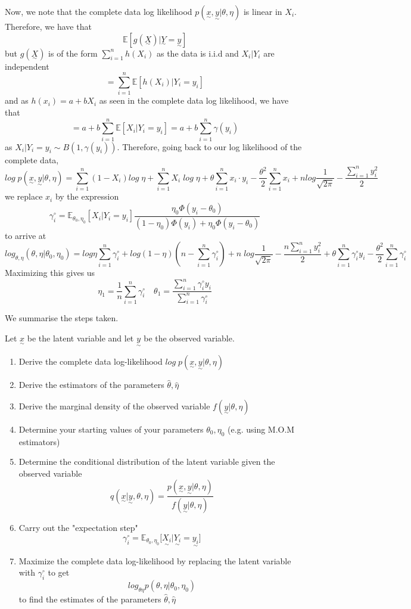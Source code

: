 \documentclass[twoside]{article}
\newcommand{\utilde}{\underset{\sim}}
\begin{document}
Now, we note that the complete data log likelihood $p(\utilde{x}, \utilde{y}| \theta, \eta)$ is linear in $X_i.$ Therefore, we have that
$$
\mathbb{E}[g(\utilde{X})|\utilde{Y} = \utilde{y}]
$$
but $g(\utilde{X})$ is of the form $\sum_{i=1}^{n}h(X_i)$ as the data is i.i.d and $X_i|Y_i$ are independent 
$$
= \sum_{i=1}^{n}\mathbb{E}[h(X_i)| Y_i = y_i]
$$
and as $h(x_i) = a + bX_i$ as seen in the complete data log likelihood, we have that 
$$
= a + b\sum_{i=1}^{n}\mathbb{E}[X_i| Y_i = y_i] = a + b\sum_{i=1}^{n}\gamma(y_i)
$$
as $X_i|Y_i = y_i \sim B(1, \gamma(y_i))$. Therefore, going back to our log likelihood of the complete data, 
$$
log\; p(\utilde{x},\utilde{y}|\theta, \eta) = \sum_{i=1}^{n}(1 - X_i)log\;\eta + \sum_{i=1}^{n}X_i\;log\;\eta + \theta \sum_{i=1}^{n}x_i\cdot y_i - \frac{\theta^2}{2}\sum_{i=1}^{n}x_i + nlog\frac{1}{\sqrt{2\pi}} - \frac{\sum_{i=1}^{n}y_i^2}{2}
$$
we replace $x_i$ by the expression 
$$
\gamma_i^{\circ} = \mathbb{E}_{\theta_{0}, \eta_{0}}[X_i|Y_i = y_i] \frac{\eta_0 \Phi(y_i - \theta_0)}{(1 - \eta_0)\Phi(y_i) + \eta_0 \Phi(y_i - \theta_0)}
$$
to arrive at 
$$
log_{\theta ,\eta}(\theta, \eta|\theta_0, \eta_0) = log\eta\sum_{i=1}^{n}\gamma_i^{\circ} + log(1 - \eta)(n - \sum_{i=1}^{n}\gamma_i^{\circ}) + n\;log\frac{1}{\sqrt{2 \pi}} - \frac{n \sum_{i=1}^{n}y_i^2}{2} + \theta \sum_{i=1}^{n}\gamma_i^{\circ}y_i - \frac{\theta^2}{2}\sum_{i=1}^{n}\gamma_i^{\circ}
$$
Maximizing this gives us 
$$
\eta_1 = \frac{1}{n}\sum_{i=1}^{n}\gamma_i^{\circ} \quad \theta_1 = \frac{\sum_{i=1}^{n}\gamma_i^{\circ}y_i}{\sum_{i=1}^{n}\gamma_i^{\circ}}
$$


We summarise the steps taken.


Let $\utilde{x}$ be the latent variable and let $\utilde{y}$ be the observed variable.
\begin{enumerate}
\item Derive the complete data log-likelihood $log\;p(\utilde{x}, \utilde{y}|\theta, \eta)$
\item Derive the estimators of the parameters $\hat{\theta}, \hat{\eta}$
\item Derive the marginal density of the observed variable $f(\utilde{y}|\theta, \eta)$
\item Determine your starting values of your parameters $\theta_0, \eta_0$ (e.g. using M.O.M estimators)
\item Determine the conditional distribution of the latent variable given the observed variable $$
q(\utilde{x}|\utilde{y}, \theta, \eta) = \frac{p(\utilde{x}, \utilde{y}|\theta, \eta)}{f(\utilde{y}|\theta, \eta)}
$$
\item Carry out the "expectation step" 
$$
\gamma_i^{\circ} = \mathbb{E}_{\theta_{0}, \eta_{0}}\bigg[\utilde{X_i}|\utilde{Y_i} = \utilde{y_i} \bigg]
$$
\item Maximize the complete data log-likelihood by replacing the latent variable with $\gamma_i^{\circ}$ to get 
$$
log_{\theta \eta}p(\theta, \eta| \theta_0, \eta_0)
$$
to find the estimates of the parameters $\hat{\theta}, \hat{\eta}$
\end{enumerate}
\end{document}
